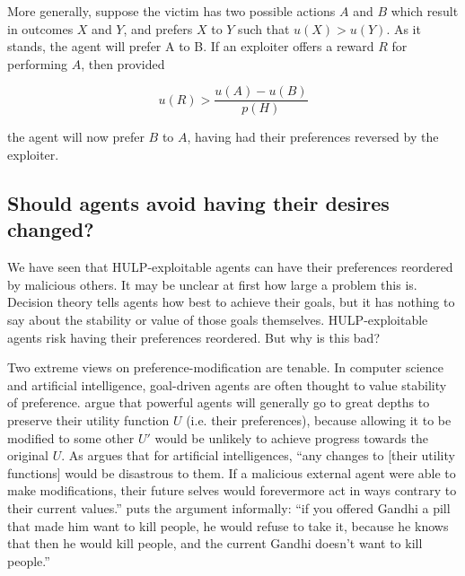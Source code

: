 \documentclass{article}
\begin{document}
More generally, suppose the victim has two possible actions \(A\) and \(B\) which result in outcomes \(X\) and \(Y\), and prefers \(X\) to \(Y\) such that \(u(X)>u(Y)\). As it stands, the agent will prefer A to B. If an exploiter offers a reward \(R\) for performing \(A\), then provided

\[u(R) > \frac{u(A)-u(B)}{p(H)}\]

the agent will now prefer \(B\) to \(A\), having had their preferences reversed by the exploiter.

\subsection{Should agents avoid having their desires changed?}

We have seen that HULP-exploitable agents can have their preferences reordered by malicious others. It may be unclear at first how large a problem this is. Decision theory tells agents how best to achieve their goals, but it has nothing to say about the stability or value of those goals themselves. HULP-exploitable agents risk having their preferences reordered. But why is this bad?

Two extreme views on preference-modification are tenable. In computer science and artificial intelligence, goal-driven agents are often thought to value stability of preference. \citep{omohundro2008basic,bostrom2012will} argue that powerful agents will generally go to great depths to preserve their utility function \(U\) (i.e. their preferences), because allowing it to be modified to some other \(U'\) would be unlikely to achieve progress towards the original \(U\). As \citep{omohundro2008basic} argues that for artificial intelligences, ``any changes to [their utility functions] would be disastrous to them. If a malicious external agent were able to make modifications, their future selves would forevermore act in ways contrary to their current values.'' \citep{1_yudkowsky_2012} puts the argument informally: ``if you offered Gandhi a pill that made him want to kill people, he would refuse to take it, because he knows that then he would kill people, and the current Gandhi doesn't want to kill people.'' %
\end{document}
